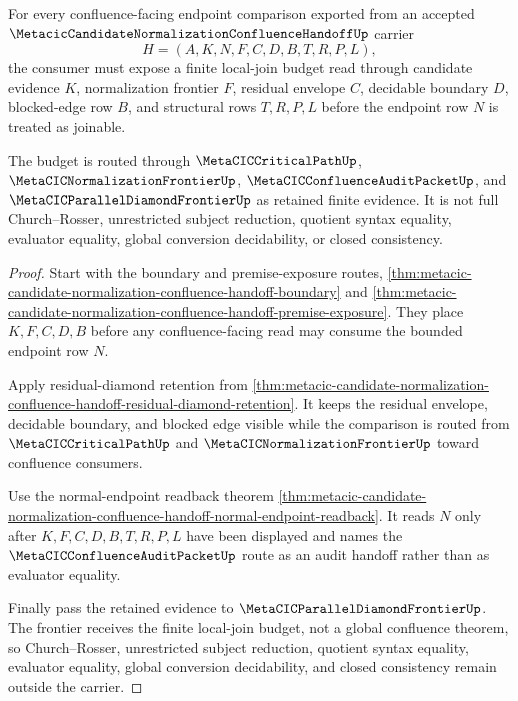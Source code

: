 \begin{theorem}
\label{thm:metacic-candidate-handoff-local-join-budget}
For every confluence-facing endpoint comparison exported from an accepted $\MetacicCandidateNormalizationConfluenceHandoffUp$ carrier
$$
H=(A,K,N,F,C,D,B,T,R,P,L),
$$
the consumer must expose a finite local-join budget read through candidate evidence $K$, normalization frontier $F$, residual envelope $C$, decidable boundary $D$, blocked-edge row $B$, and structural rows $T,R,P,L$ before the endpoint row $N$ is treated as joinable.

The budget is routed through $\MetaCICCriticalPathUp$, $\MetaCICNormalizationFrontierUp$, $\MetaCICConfluenceAuditPacketUp$, and $\MetaCICParallelDiamondFrontierUp$ as retained finite evidence. It is not full Church--Rosser, unrestricted subject reduction, quotient syntax equality, evaluator equality, global conversion decidability, or closed consistency.
\end{theorem}
\begin{proof}
Start with the boundary and premise-exposure routes, \autoref{thm:metacic-candidate-normalization-confluence-handoff-boundary} and \autoref{thm:metacic-candidate-normalization-confluence-handoff-premise-exposure}. They place $K,F,C,D,B$ before any confluence-facing read may consume the bounded endpoint row $N$.

Apply residual-diamond retention from \autoref{thm:metacic-candidate-normalization-confluence-handoff-residual-diamond-retention}. It keeps the residual envelope, decidable boundary, and blocked edge visible while the comparison is routed from $\MetaCICCriticalPathUp$ and $\MetaCICNormalizationFrontierUp$ toward confluence consumers.

Use the normal-endpoint readback theorem \autoref{thm:metacic-candidate-normalization-confluence-handoff-normal-endpoint-readback}. It reads $N$ only after $K,F,C,D,B,T,R,P,L$ have been displayed and names the $\MetaCICConfluenceAuditPacketUp$ route as an audit handoff rather than as evaluator equality.

Finally pass the retained evidence to $\MetaCICParallelDiamondFrontierUp$. The frontier receives the finite local-join budget, not a global confluence theorem, so Church--Rosser, unrestricted subject reduction, quotient syntax equality, evaluator equality, global conversion decidability, and closed consistency remain outside the carrier.
\end{proof}

